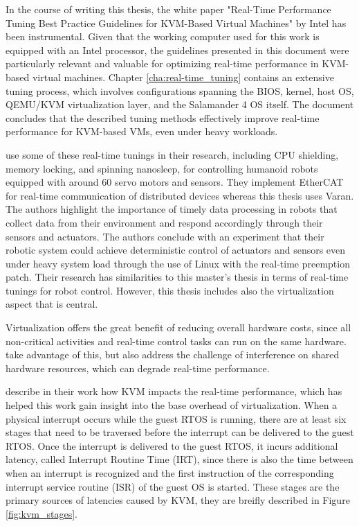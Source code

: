 \documentclass[MMR,Master,english]{twbook}
\begin{document}
\bigskip \noindent In the course of writing this thesis, the white paper "Real-Time Performance Tuning Best Practice Guidelines for KVM-Based Virtual Machines" \cite{RealTimePerformanceTuning2022} by Intel has been instrumental. Given that the working computer used for this work is equipped with an Intel processor, the guidelines presented in this document were particularly relevant and valuable for optimizing real-time performance in KVM-based virtual machines. Chapter \ref{cha:real-time_tuning} contains an extensive tuning process, which involves configurations spanning the BIOS, kernel, host OS, QEMU/KVM virtualization layer, and the Salamander 4 OS itself. The document concludes that the described tuning methods effectively improve real-time performance for KVM-based VMs, even under heavy workloads.

\bigskip \noindent \citeauthor{yoonRealTimePerformanceAnalysis} \cite{yoonRealTimePerformanceAnalysis} use some of these real-time tunings in their research, including CPU shielding, memory locking, and spinning nanosleep, for controlling humanoid robots equipped with around 60 servo motors and sensors. They implement EtherCAT for real-time communication of distributed devices whereas this thesis uses Varan. The authors highlight the importance of timely data processing in robots that collect data from their environment and respond accordingly through their sensors and actuators. The authors conclude with an experiment that their robotic system could achieve deterministic control of actuators and sensors even under heavy system load through the use of Linux with the real-time preemption patch. Their research has similarities to this master's thesis in terms of real-time tunings for robot control. However, this thesis includes also the virtualization aspect that is central. 

\bigskip \noindent Virtualization offers the great benefit of reducing overall hardware costs, since all non-critical activities and real-time control tasks can run on the same hardware. \citeauthor{scordinoRealTimeVirtualizationIndustrial2020} \cite{scordinoRealTimeVirtualizationIndustrial2020} take advantage of this, but also address the challenge of interference on shared hardware resources, which can degrade real-time performance. 

\bigskip \noindent \citeauthor{maPerformanceTuningKVMbased} \cite{maPerformanceTuningKVMbased} \cite{junzhangPerformanceAnalysisKVMBased2010} describe in their work how KVM impacts the real-time performance, which has helped this work gain insight into the base overhead of virtualization. When a physical interrupt occurs while the guest RTOS is running, there are at least six stages that need to be traversed before the interrupt can be delivered to the guest RTOS. Once the interrupt is delivered to the guest RTOS, it incurs additional latency, called Interrupt Routine Time (IRT), since there is also the time between when an interrupt is recognized and the first instruction of the corresponding interrupt service routine (ISR) of the guest OS is started. These stages are the primary sources of latencies caused by KVM, they are breifly described in Figure \ref{fig:kvm_stages}.
\end{document}
